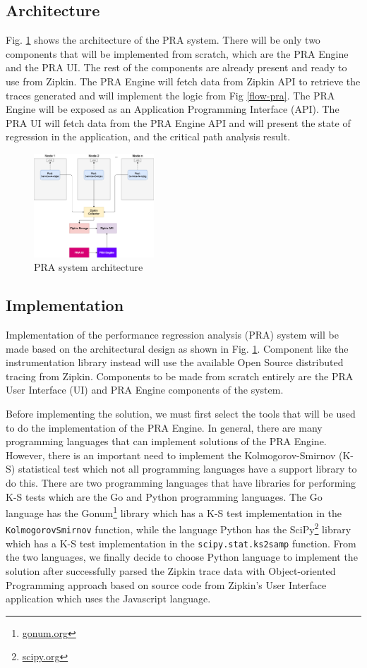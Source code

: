 \documentclass[conference]{configs/IEEEtran}
\begin{document}
\subsection{Architecture}
Fig. \ref{arch-pra} shows the architecture of the PRA system. There will be only two components that will be implemented from scratch, which are the PRA Engine and the PRA UI. The rest of the components are already present and ready to use from Zipkin. The PRA Engine will fetch data from Zipkin API to retrieve the traces generated and will implement the logic from Fig \ref{flow-pra}. The PRA Engine will be exposed as an Application Programming Interface (API). The PRA UI will fetch data from the PRA Engine API and will present the state of regression in the application, and the critical path analysis result.
\begin{figure}[!htb]
	\centering
	\includegraphics[width=0.4\textwidth]{resources/ch3/arch.png}
	\caption{PRA system architecture}
	\label{arch-pra}
\end{figure}

\subsection{Implementation}
Implementation of the performance regression analysis (PRA) system will be made based on the architectural design as shown in Fig. \ref{arch-pra}. Component
like the instrumentation library instead will use the available
Open Source distributed tracing from Zipkin. Components to be made from scratch entirely are the PRA User Interface (UI) and PRA Engine components of the system.

Before implementing the solution, we  must first
select the tools that will be used to do the implementation of the PRA Engine. In general, there are many programming languages that can implement solutions of the PRA Engine. However, there is an important need to implement the Kolmogorov-Smirnov (K-S) statistical test which not all programming languages have a support library to do this. There are two programming languages that have libraries for performing K-S tests
which are the Go and Python programming languages. The Go language has the Gonum\footnote{\url{gonum.org}} library which
has a K-S test implementation in the \texttt{KolmogorovSmirnov} function, while the language
Python has the SciPy\footnote{\url{scipy.org}} library which has a K-S test implementation in the \texttt{scipy.stat.ks\textunderscore 2samp} function. From the two languages, we finally decide to choose Python language to implement the solution after successfully parsed the Zipkin trace data with Object-oriented Programming approach based on source code from Zipkin's User Interface application which uses the Javascript language.
\end{document}
